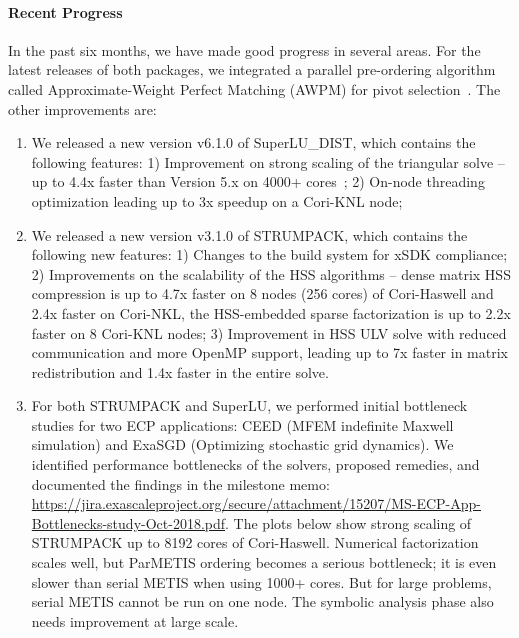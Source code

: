 \paragraph{Recent Progress}
In the past six months, we have made good progress in several areas.
For the latest releases of both packages, we integrated a parallel
pre-ordering algorithm called Approximate-Weight Perfect Matching (AWPM)
for pivot selection~\cite{AWPM2018}. The other improvements are:
\begin{enumerate}
\item We released a new version v6.1.0 of SuperLU\_DIST, which contains
      the following features:
      1) Improvement on strong scaling of the 
      triangular solve -- up to 4.4x faster than Version 5.x on 4000+
      cores~\cite{LiuTriSolve2018};
      2) On-node threading optimization leading up to 3x speedup on a Cori-KNL node;
\item We released a new version v3.1.0 of STRUMPACK, which contains the
      following new features:
      1) Changes to the build system for xSDK compliance;
      2) Improvements on the scalability of the HSS algorithms --
      dense matrix HSS compression is up to 4.7x faster on 8 nodes (256 cores)
      of Cori-Haswell and 2.4x faster on Cori-NKL, the HSS-embedded sparse
      factorization is up to 2.2x faster on 8 Cori-KNL nodes;
      3) Improvement in HSS ULV solve with reduced communication and more
      OpenMP support, leading up to 7x faster in matrix redistribution and
      1.4x faster in the entire solve.
\item For both STRUMPACK and SuperLU, we performed initial bottleneck studies
  for two ECP applications: CEED (MFEM indefinite Maxwell simulation) and
  ExaSGD (Optimizing stochastic grid dynamics). We identified performance
  bottlenecks of the solvers, proposed remedies, and documented the
  findings in the milestone memo: 
{\url{https://jira.exascaleproject.org/secure/attachment/15207/MS-ECP-App-Bottlenecks-study-Oct-2018.pdf}}.
  The plots below show strong scaling of STRUMPACK up to 8192 cores of 
  Cori-Haswell. Numerical factorization scales well, but ParMETIS ordering 
  becomes a serious bottleneck; it is even slower than serial METIS when using
  1000+ cores. But for large problems, serial METIS cannot be run on one node.
  The symbolic analysis phase also needs improvement at large scale.
\end{enumerate}

